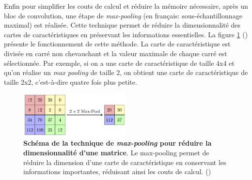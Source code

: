 Enfin pour simplifier les couts de calcul et réduire la mémoire nécessaire, après un bloc de convolution, une étape de \textit{max-pooling }(en français: sous-échantillonnage maximal) est réalisée. Cette technique permet de réduire la dimensionnalité des cartes de caractéristiques en préservant les informations essentielles. La figure \ref{fig:max-pool} (\cite{aurelien_geron_hands-machine_2019}) présente le fonctionnement de cette méthode. La carte de caractéristique est divisée en carré non chevauchant et la valeur maximale de chaque carré est sélectionnée. Par exemple, si on a une carte de caractéristique de taille 4x4 et qu'on réalise un \textit{max pooling} de taille 2, on obtient une carte de caractéristique de taille 2x2, c'est-à-dire quatre fois plus petite.
\begin{figure}[!htbp]
 \centering
 \includegraphics[width=0.5\textwidth]{figures/max-pool.png}
 \caption[Technique de max-pooling]{\textbf{Schéma de la technique de \textit{max-pooling} pour réduire la dimensionnalité d'une matrice}. Le max-pooling permet de réduire la dimension d'une carte de caractéristique en conservant les informations importantes, réduisant ainsi les couts de calcul. (\cite{aurelien_geron_hands-machine_2019})}
 \label{fig:max-pool}
\end{figure}


